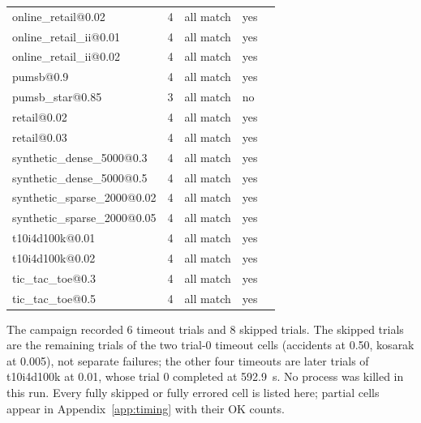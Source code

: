 \documentclass[journal,a4paper]{IEEEtran}
\begin{document}
\begin{table}[t]
\begin{tabular}{lllll}
online\_retail@0.02 & 4 & all match & yes &  \\
online\_retail\_ii@0.01 & 4 & all match & yes &  \\
online\_retail\_ii@0.02 & 4 & all match & yes &  \\
pumsb@0.9 & 4 & all match & yes &  \\
pumsb\_star@0.85 & 3 & all match & no &  \\
retail@0.02 & 4 & all match & yes &  \\
retail@0.03 & 4 & all match & yes &  \\
synthetic\_dense\_5000@0.3 & 4 & all match & yes &  \\
synthetic\_dense\_5000@0.5 & 4 & all match & yes &  \\
synthetic\_sparse\_2000@0.02 & 4 & all match & yes &  \\
synthetic\_sparse\_2000@0.05 & 4 & all match & yes &  \\
t10i4d100k@0.01 & 4 & all match & yes &  \\
t10i4d100k@0.02 & 4 & all match & yes &  \\
tic\_tac\_toe@0.3 & 4 & all match & yes &  \\
tic\_tac\_toe@0.5 & 4 & all match & yes &  \\
\bottomrule
\end{tabular}
\end{table}
The campaign recorded 6 timeout trials and 8 skipped trials. The skipped trials are the remaining trials of the two trial-0 timeout cells (accidents at 0.50, kosarak at 0.005), not separate failures; the other four timeouts are later trials of t10i4d100k at 0.01, whose trial 0 completed at 592.9~s. No process was killed in this run. Every fully skipped or fully errored cell is listed here; partial cells appear in Appendix~\ref{app:timing} with their OK counts.
\end{document}
